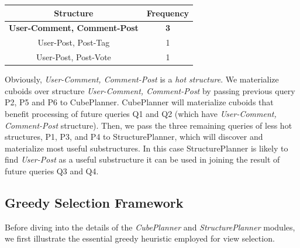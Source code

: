 
\begin{center}
	\begin{tabular}{ | c | c |}
		\hline
		Structure	&Frequency	\\ \hline
		\textbf{User-Comment, Comment-Post} 	&\textbf{3} \\ \hline
		User-Post, Post-Tag 	&1 \\ \hline
		User-Post, Post-Vote	&1 \\ \hline
	\end{tabular}
	\end {center}
	
	Obviously,  \textit{User-Comment, Comment-Post} is a \emph{hot structure}. We materialize cuboids over structure \textit{User-Comment, Comment-Post} by passing previous query P2, P5 and P6 to CubePlanner. CubePlanner will materialize cuboids that benefit processing of future queries Q1 and Q2 (which have \textit{User-Comment, Comment-Post} structure). Then, we pass the three remaining queries of less hot structures,  P1, P3, and P4 to StructurePlanner, which will discover and materialize most useful substructures. In this case StructurePlanner is likely to find \textit{User-Post} as a useful substructure it can be used in joining the result of future queries Q3 and Q4.
	
	
	\subsection{Greedy Selection Framework}
	\label{s:Greedy Selection Framework}
	
	Before diving into the details of the \emph{CubePlanner} and \emph{StructurePlanner} modules, we first illustrate the essential greedy heuristic employed for view selection. %
	
